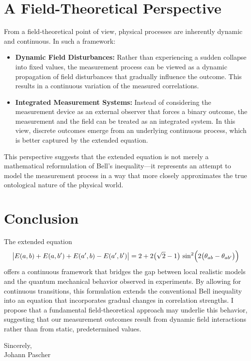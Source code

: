 \documentclass[12pt,landscape]{article}
\begin{document}
	\section*{A Field-Theoretical Perspective}
	From a field-theoretical point of view, physical processes are inherently dynamic and continuous. In such a framework:
	\begin{itemize}
		\item \textbf{Dynamic Field Disturbances:} Rather than experiencing a sudden collapse into fixed values, the measurement process can be viewed as a dynamic propagation of field disturbances that gradually influence the outcome. This results in a continuous variation of the measured correlations.
		\item \textbf{Integrated Measurement Systems:} Instead of considering the measurement device as an external observer that forces a binary outcome, the measurement and the field can be treated as an integrated system. In this view, discrete outcomes emerge from an underlying continuous process, which is better captured by the extended equation.
	\end{itemize}
	This perspective suggests that the extended equation is not merely a mathematical reformulation of Bell's inequality—it represents an attempt to model the measurement process in a way that more closely approximates the true ontological nature of the physical world.
	
	\section*{Conclusion}
	The extended equation
	\[
	\bigl|E(a,b) + E(a,b') + E(a',b) - E(a',b')\bigr| = 2 + 2\bigl(\sqrt{2}-1\bigr)\,\sin^2\Bigl(2\bigl(\theta_{ab}-\theta_{ab'}\bigr)\Bigr)
	\]
	offers a continuous framework that bridges the gap between local realistic models and the quantum mechanical behavior observed in experiments. By allowing for continuous transitions, this formulation extends the conventional Bell inequality into an equation that incorporates gradual changes in correlation strengths. I propose that a fundamental field-theoretical approach may underlie this behavior, suggesting that our measurement outcomes result from dynamic field interactions rather than from static, predetermined values.
	
	Sincerely,\\
	Johann Pascher
	
\end{document}
